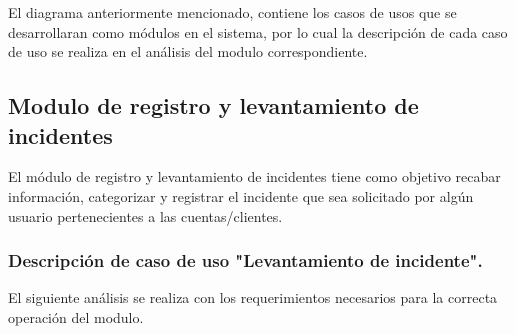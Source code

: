 El diagrama anteriormente mencionado, contiene los casos de usos que se desarrollaran como módulos en el sistema, por lo cual la descripción de cada caso de uso se realiza en el análisis del modulo correspondiente. 

\subsection{Modulo de registro y levantamiento de incidentes}
El módulo de registro y levantamiento de incidentes tiene como objetivo recabar información, categorizar y registrar el incidente que sea solicitado por algún usuario pertenecientes a las cuentas/clientes.


\subsubsection{Descripción de caso de uso "Levantamiento de incidente".}
El siguiente análisis se realiza con los requerimientos necesarios para la correcta operación del modulo.

